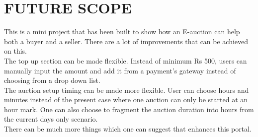\documentclass[12pt]{article}
\begin{document}
\section{FUTURE SCOPE}
This is a mini project that has been built to show how an E-auction can help both a buyer and a seller. There are a lot of improvements that can be achieved on this.\\
The top up section can be made flexible. Instead of minimum Rs 500, users can manually input the amount and add it from a payment's gateway instead of choosing from a drop down list.\\
The auction setup timing can be made more flexible. User can choose hours and minutes instead of the present case where one auction can only be started at an hour mark. One can also choose to fragment the auction duration into hours from the current days only scenario.\\
There can be much more things which one can suggest that enhances this portal.

\newpage


\end{document}
